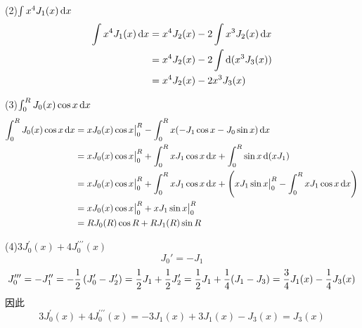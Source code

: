 \documentclass[UTF8,9pt]{ctexart}
\begin{document}
(2)$\int x^{4} J_{1}(x) \mathop{}\!\mathrm{d} x$\\
$$\begin{aligned} 
\int x^{4} J_{1}(x) \mathop{}\!\mathrm{d} x &= x^4J_2(x)-2\int x^3J_2(x)\mathop{}\!\mathrm{d} x\\
&= x^4J_2(x)-2\int \mathop{}\!\mathrm{d}(x^3J_3(x))\\
&= x^4J_2(x)-2x^3J_3(x)
 \end{aligned}$$

(3)$\int_{0}^{R} J_{0}(x) \cos x \mathop{}\!\mathrm{d} x$
$$\begin{aligned} 
\int_{0}^{R} J_{0}(x) \cos x \mathop{}\!\mathrm{d} x &= xJ_{0}(x) \cos x\big|_0^R -\int_0^Rx(-J_1\cos x-J_0\sin x)\mathop{}\!\mathrm{d} x\\
&= xJ_{0}(x) \cos x\big|_0^R +\int_0^RxJ_1\cos x\mathop{}\!\mathrm{d} x+\int_0^R\sin x\mathop{}\!\mathrm{d}(x J_1)\\
&= xJ_{0}(x) \cos x\big|_0^R +\int_0^RxJ_1\cos x\mathop{}\!\mathrm{d} x+\left( xJ_1\sin x\big|_0^R -\int_0^RxJ_1\cos x\mathop{}\!\mathrm{d} x \right)\\
&= xJ_{0}(x) \cos x\big|_0^R + xJ_1\sin x\big|_0^R \\
&= RJ_0(R)\cos R +RJ_1(R)\sin R
 \end{aligned}$$

(4)$3 J_{0}^{\prime}(x)+4 J_{0}^{\prime \prime \prime}(x)$
$$J_0' = -J_1$$
$$J_0''' = -J_1'' = -\frac{1}{2}\left( J'_0-J'_2 \right) = \frac{1}{2}J_1+\frac{1}{2}J_2' = \frac{1}{2}J_1+\frac{1}{4}(J_1-J_3) = \frac{3}{4}J_1(x)-\frac{1}{4}J_3(x)$$
因此
$$3 J_{0}^{\prime}(x)+4 J_{0}^{\prime \prime \prime}(x) = -3J_1(x) + 3J_1(x) -J_3(x) = J_3(x)$$
\end{document}
